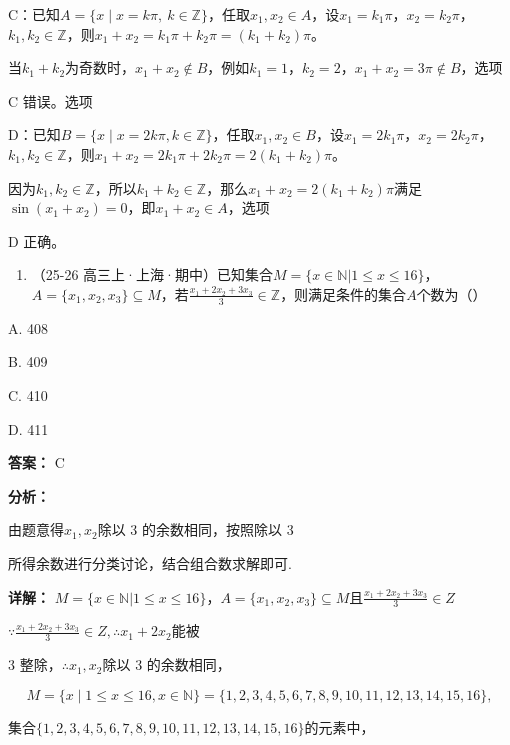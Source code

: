 \documentclass[11pt,a4paper]{ctexart}
\begin{document}
C：已知\(A=\{x\mid x=k\pi,\ k\in\mathbb Z\}\)，任取\(x_{1}, x_{2} \in A\)，设\(x_{1} = k_{1}\pi\)，\(x_{2} = k_{2}\pi\)，\(k_{1}, k_{2} \in \mathbb{Z}\)，则\(x_{1} + x_{2} = k_{1}\pi + k_{2}\pi = (k_{1} + k_{2})\pi\)。

当\(k_{1} + k_{2}\)为奇数时，\(x_{1} + x_{2} \notin B\)，例如\(k_{1} = 1\)，\(k_{2} = 2\)，\(x_{1} + x_{2} = 3\pi \notin B\)，选项

C 错误。选项

D：已知\(B = \{x \mid x = 2k\pi, k \in \mathbb{Z}\}\)，任取\(x_{1}, x_{2} \in B\)，设\(x_{1} = 2k_{1}\pi\)，\(x_{2} = 2k_{2}\pi\)，\(k_{1}, k_{2} \in \mathbb{Z}\)，则\(x_{1} + x_{2} = 2k_{1}\pi + 2k_{2}\pi = 2(k_{1} + k_{2})\pi\)。

因为\(k_{1}, k_{2} \in \mathbb{Z}\)，所以\(k_{1} + k_{2} \in \mathbb{Z}\)，那么\(x_{1} + x_{2} = 2(k_{1} + k_{2})\pi\)满足\(\sin(x_{1} + x_{2}) = 0\)，即\(x_{1} + x_{2} \in A\)，选项

D 正确。

\begin{enumerate}[label=\arabic*., leftmargin=*, start=17]
\item （25-26
  高三上·上海·期中）已知集合\(M = \{x \in \mathbb{N} | 1 \leq x \leq 16\}\)，\(A = \{x_{1}, x_{2}, x_{3}\} \subseteq M\)，若\(\frac{x_{1} + 2x_{2} + 3x_{3}}{3} \in \mathbb{Z}\)，则满足条件的集合\(A\)个数为（）
\end{enumerate}

A. 408

B. 409

C. 410

D. 411

\textbf{答案：}
C

\textbf{分析：}

由题意得\(x_{1}, x_{2}\)除以 3 的余数相同，按照除以 3

所得余数进行分类讨论，结合组合数求解即可.

\textbf{详解：}
\(M=\{x\in \mathbb{N}|1\leq x\leq16\}\)，\(A=\{x_{1},x_{2},x_{3}\}\subseteq M\)且\(\frac{x_{1}+2x_{2}+3x_{3}}{3}\in Z\)

\(\because \frac{x_1 + 2x_2 + 3x_3}{3} \in Z, \therefore x_1 + 2x_2\)能被

3 整除，\(\therefore x_1, x_2\)除以 3 的余数相同，

\[
M = \{x \mid 1 \leq x \leq 1 6, x \in \mathbb{N} \} = \{1, 2, 3, 4, 5, 6, 7, 8, 9, 1 0, 1 1, 1 2, 1 3, 1 4, 1 5, 1 6 \},
\]

集合\(\{1,2,3,4,5,6,7,8,9,10,11,12,13,14,15,16\}\)的元素中，
\end{document}
